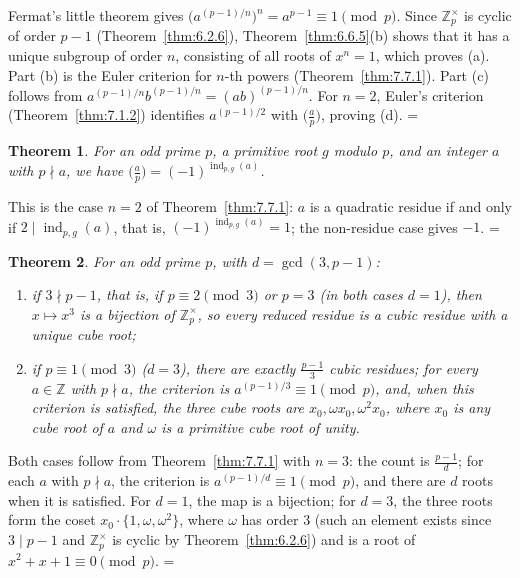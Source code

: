 \documentclass[11pt]{article}
\makeatletter
\let\nt@closedisplay\]
\def\nt@guardedclose{\@ifnextchar\par{\nt@closeafterpar}{\@ifnextchar\end{\postdisplaypenalty\@M\nt@closedisplay}{\nt@closedisplay}}}
\def\nt@closeafterpar\par{\@ifnextchar\par{\nt@closeafterpar}{\@ifnextchar\end{\postdisplaypenalty\@M\nt@closedisplay\par}{\nt@closedisplay\par}}}
\renewenvironment{proof}[1][\proofname]{\par
  \pushQED{\qed}\normalfont\topsep\medskipamount\edef\nt@afterproof{\@endparpenalty=\the\@endparpenalty\relax}\@beginparpenalty\@M\@endparpenalty\@M\let\]\nt@guardedclose\trivlist\item[]\textit{#1\@addpunct{.}} \ignorespaces}{\ifvmode\addpenalty\@M\fi\popQED\nt@afterproof\endtrivlist\@endpefalse}
\theoremstyle{ntstyle}
\newtheorem{theorem}{Theorem}[subsection]
\newcommand{\legs}[2]{\bigl(\tfrac{#1}{#2}\bigr)}
\newcommand{\ZmodUnits}[1]{\mathbb{Z}_{#1}^{\times}}
\DeclareMathOperator{\ind}{ind}
\makeatother
\begin{document}
\begin{proof} Fermat's little theorem gives
  $\big(a^{(p-1)/n}\big)^n=a^{p-1}\equiv1\pmod{p}$. Since
  $\ZmodUnits{p}$ is cyclic of order $p-1$ (Theorem~\ref{thm:6.2.6}), Theorem~\ref{thm:6.6.5}(b) shows that it has a unique
  subgroup of order $n$, consisting of all roots of $x^n=1$, which proves
  (a). Part (b) is the Euler criterion for $n$-th powers (Theorem~\ref{thm:7.7.1}). Part (c) follows from
  $a^{(p-1)/n}b^{(p-1)/n}=(ab)^{(p-1)/n}$. For $n=2$, Euler's criterion
  (Theorem~\ref{thm:7.1.2}) identifies $a^{(p-1)/2}$ with $\legs{a}{p}$, proving
  (d).
\end{proof}

\begin{theorem}\label{thm:7.7.4} For an odd
  prime $p$, a primitive root $g$ modulo $p$, and an integer $a$ with $p \nmid a$, we have
  $\legs{a}{p} = (-1)^{\ind_{p,g}(a)}$.

\end{theorem}

\begin{proof} This is the case $n = 2$ of Theorem~\ref{thm:7.7.1}:
  $a$ is a quadratic residue if and only if $2 \mid \ind_{p,g}(a)$,
  that is, $(-1)^{\ind_{p,g}(a)} = 1$; the non-residue case
  gives $-1$.
\end{proof}

\begin{theorem}\label{thm:7.7.5} For an odd prime
  $p$, with $d = \gcd(3, p-1)$:

  \begin{enumerate}[label={\alph*)}]
    \item if $3 \nmid p - 1$, that is, if $p \equiv 2 \pmod{3}$ or $p = 3$
          (in both cases $d = 1$), then $x \mapsto x^{3}$ is a bijection of
          $\ZmodUnits{p}$, so every reduced residue is a cubic residue
          with a unique cube root;
    \item if $p \equiv 1 \pmod{3}$ ($d = 3$), there are exactly
          $\tfrac{p-1}{3}$ cubic residues; for every $a\in\mathbb{Z}$ with
          $p\nmid a$, the criterion is $a^{(p-1)/3} \equiv 1\pmod{p}$,
          and, when this criterion is satisfied, the three cube roots are $x_0, \omega x_0, \omega^{2} x_0$, where
          $x_0$ is any cube root of $a$ and $\omega$ is a primitive cube root of unity.
  \end{enumerate}

\end{theorem}

\begin{proof} Both cases follow from Theorem~\ref{thm:7.7.1} with $n = 3$:
  the count is $\tfrac{p-1}{d}$; for each $a$ with $p\nmid a$, the criterion
  is $a^{(p-1)/d} \equiv 1 \pmod{p}$, and there are $d$ roots when it is
  satisfied. For $d = 1$, the map is a bijection; for
  $d = 3$, the three roots form the coset $x_0 \cdot \{1, \omega, \omega^{2}\}$, where $\omega$ has order $3$ (such
  an element exists since $3 \mid p-1$ and $\ZmodUnits{p}$ is cyclic by Theorem~\ref{thm:6.2.6}) and is a root of
  $x^{2} + x + 1 \equiv 0 \pmod{p}$.
\end{proof}
\end{document}
